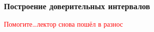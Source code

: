 \subsubsection{Построение доверительных интервалов}

\textcolor{red}{Помогите\ldots лектор снова пошёл в разнос}